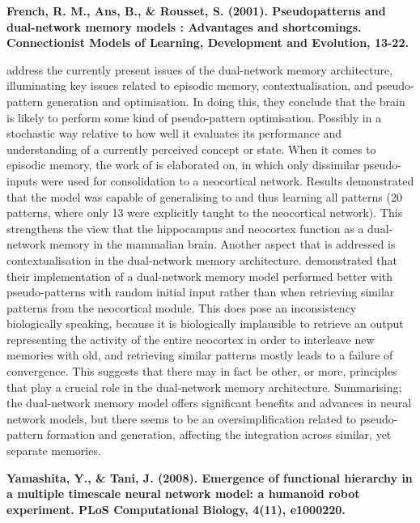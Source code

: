 \textbf{French, R. M., Ans, B., \& Rousset, S. (2001). Pseudopatterns and dual-network memory models : Advantages and shortcomings. Connectionist Models of Learning, Development and Evolution, 13-22.}

\cite{French2001} address the currently present issues of the dual-network memory architecture, illuminating key issues related to episodic memory, contextualisation, and pseudo-pattern generation and optimisation. In doing this, they conclude that the brain is likely to perform some kind of pseudo-pattern optimisation. Possibly in a stochastic way relative to how well it evaluates its performance and understanding of a currently perceived concept or state. When it comes to episodic memory, the work of \cite{Ans2000} is elaborated on, in which only dissimilar pseudo-inputs were used for consolidation to a neocortical network. Results demonstrated that the model was capable of generalising to and thus learning all patterns (20 patterns, where only 13 were explicitly taught to the neocortical network). This strengthens the view that the hippocampus and neocortex function as a dual-network memory in the mammalian brain. Another aspect that is addressed is contextualisation in the dual-network memory architecture. \cite{Ans2000} demonstrated that their implementation of a dual-network memory model performed better with pseudo-patterns with random initial input rather than when retrieving similar patterns from the neocortical module. This does pose an inconsistency biologically speaking, because it is biologically implausible to retrieve an output representing the activity of the entire neocortex in order to interleave new memories with old, and retrieving similar patterns mostly leads to a failure of convergence. This suggests that there may in fact be other, or more, principles that play a crucial role in the dual-network memory architecture. Summarising; the dual-network memory model offers significant benefits and advances in neural network models, but there seems to be an oversimplification related to pseudo-pattern formation and generation, affecting the integration across similar, yet separate memories.


\textbf{Yamashita, Y., \& Tani, J. (2008). Emergence of functional hierarchy in a multiple timescale neural network model: a humanoid robot experiment. PLoS Computational Biology, 4(11), e1000220.}

